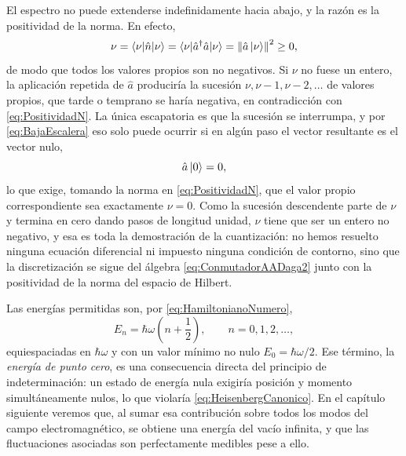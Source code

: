         El espectro no puede extenderse indefinidamente hacia abajo, y la razón es la positividad de la norma. En efecto,
        \begin{equation}\label{eq:PositividadN}
            \nu = \braket{\nu|\hat{n}|\nu} = \braket{\nu|\hat{a}^{\dagger}\hat{a}|\nu} = \left\|\hat{a}\ket{\nu}\right\|^{2} \geq 0,
        \end{equation}
        de modo que todos los valores propios son no negativos. Si $\nu$ no fuese un entero, la aplicación repetida de $\hat{a}$ produciría la sucesión $\nu, \nu-1, \nu-2,\ldots$ de valores propios, que tarde o temprano se haría negativa, en contradicción con \eqref{eq:PositividadN}. La única escapatoria es que la sucesión se interrumpa, y por \eqref{eq:BajaEscalera} eso solo puede ocurrir si en algún paso el vector resultante es el vector nulo,
        \begin{equation}\label{eq:EstadoFundamental}
            \hat{a}\ket{0} = 0,
        \end{equation}
        lo que exige, tomando la norma en \eqref{eq:PositividadN}, que el valor propio correspondiente sea exactamente $\nu = 0$. Como la sucesión descendente parte de $\nu$ y termina en cero dando pasos de longitud unidad, $\nu$ tiene que ser un entero no negativo, y esa es toda la demostración de la cuantización: no hemos resuelto ninguna ecuación diferencial ni impuesto ninguna condición de contorno, sino que la discretización se sigue del álgebra \eqref{eq:ConmutadorAADaga2} junto con la positividad de la norma del espacio de Hilbert.

        Las energías permitidas son, por \eqref{eq:HamiltonianoNumero},
        \begin{equation}\label{eq:EspectroOscilador}
            E_{n} = \hbar\omega\left(n + \frac{1}{2}\right), \qquad n = 0,1,2,\ldots,
        \end{equation}
        equiespaciadas en $\hbar\omega$ y con un valor mínimo no nulo $E_{0} = \hbar\omega/2$. Ese término, la \textit{energía de punto cero}, es una consecuencia directa del principio de indeterminación: un estado de energía nula exigiría posición y momento simultáneamente nulos, lo que violaría \eqref{eq:HeisenbergCanonico}. En el capítulo siguiente veremos que, al sumar esa contribución sobre todos los modos del campo electromagnético, se obtiene una energía del vacío infinita, y que las fluctuaciones asociadas son perfectamente medibles pese a ello.

